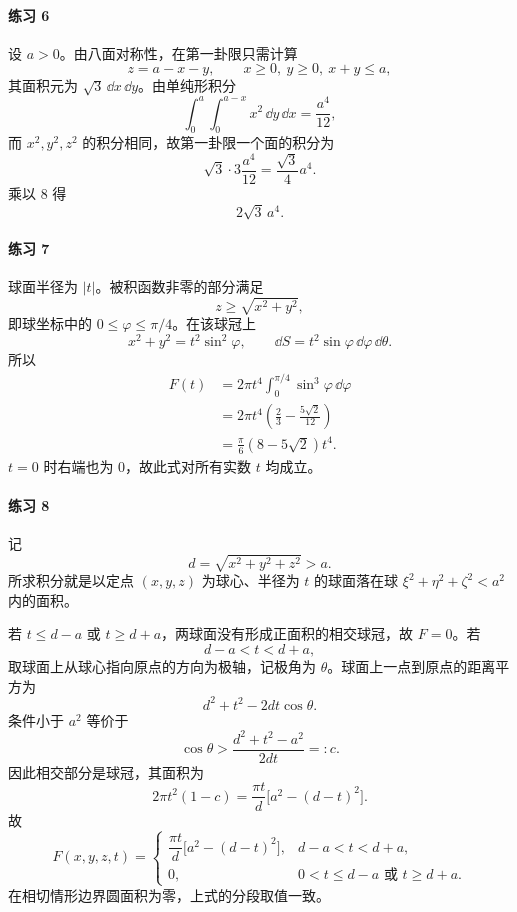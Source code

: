 \paragraph{练习 6}
\begin{xsolution}
设 $a>0$。由八面对称性，在第一卦限只需计算
\[
  z=a-x-y,\qquad x\ge0,\ y\ge0,\ x+y\le a,
\]
其面积元为 $\sqrt3\,\dd x\,\dd y$。由单纯形积分
\[
  \int_0^a\int_0^{a-x}x^2\,\dd y\,\dd x
  =\frac{a^4}{12},
\]
而 $x^2,y^2,z^2$ 的积分相同，故第一卦限一个面的积分为
\[
  \sqrt3\cdot3\frac{a^4}{12}=\frac{\sqrt3}{4}a^4.
\]
乘以 $8$ 得
\[
  \boxed{2\sqrt3\,a^4}.
\]
\end{xsolution}

\paragraph{练习 7}
\begin{xsolution}
球面半径为 $|t|$。被积函数非零的部分满足
\[
  z\ge\sqrt{x^2+y^2},
\]
即球坐标中的 $0\le\varphi\le\pi/4$。在该球冠上
\[
  x^2+y^2=t^2\sin^2\varphi,\qquad
  \dd S=t^2\sin\varphi\,\dd\varphi\,\dd\theta.
\]
所以
\begin{align*}
F(t)
&=2\pi t^4\int_0^{\pi/4}\sin^3\varphi\,\dd\varphi\\
&=2\pi t^4\left(\frac23-\frac{5\sqrt2}{12}\right)\\
&=\frac{\pi}{6}(8-5\sqrt2)t^4.
\end{align*}
$t=0$ 时右端也为 $0$，故此式对所有实数 $t$ 均成立。
\end{xsolution}

\paragraph{练习 8}
\begin{xsolution}
记
\[
  d=\sqrt{x^2+y^2+z^2}>a.
\]
所求积分就是以定点 $(x,y,z)$ 为球心、半径为 $t$ 的球面落在球 $\xi^2+\eta^2+\zeta^2<a^2$ 内的面积。

若 $t\le d-a$ 或 $t\ge d+a$，两球面没有形成正面积的相交球冠，故 $F=0$。若
\[
  d-a<t<d+a,
\]
取球面上从球心指向原点的方向为极轴，记极角为 $\theta$。球面上一点到原点的距离平方为
\[
  d^2+t^2-2dt\cos\theta.
\]
条件小于 $a^2$ 等价于
\[
  \cos\theta>\frac{d^2+t^2-a^2}{2dt}=:c.
\]
因此相交部分是球冠，其面积为
\[
  2\pi t^2(1-c)
  =\frac{\pi t}{d}\bigl[a^2-(d-t)^2\bigr].
\]
故
\[
F(x,y,z,t)=
\begin{cases}
\dfrac{\pi t}{d}\bigl[a^2-(d-t)^2\bigr],&d-a<t<d+a,\\[5pt]
0,&0<t\le d-a\text{ 或 }t\ge d+a.
\end{cases}
\]
在相切情形边界圆面积为零，上式的分段取值一致。
\end{xsolution}

